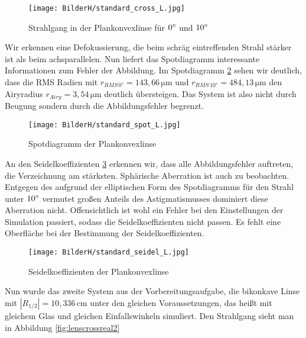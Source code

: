 \documentclass[twoside,colorback,accentcolor=tud4c,11pt]{tudreport}
\begin{document}
		
		\begin{figure}[H]
\centering
   	\begin{minipage}[b]{\textwidth}
\centering  
 	\texttt{[image: BilderH/standard\_cross\_L.jpg]}
   	\caption{Strahlgang in der Plankonvexlinse für $0\degree$ und $10\degree$}\label{fig:lenscrossreal1}
  	\end{minipage}
\end{figure}
				
		
		Wir erkennen eine Defokussierung, die beim schräg eintreffenden Strahl stärker ist als beim achsparallelen.
	Nun liefert das Spotdiagramm interessante Informationen zum Fehler der Abbildung. Im Spotdiagramm \ref{fig:lensspotreal1} sehen wir deutlich, dass die RMS Radien mit $r_{RMS \, 0°} = 143,66 \mathrm{\,\mu m} $ und $r_{RMS \, 10°} = 484,13\mathrm{\,\mu m} $ den Airyradius $r_{Airy} = 3,54 \mathrm{\,\mu m}$ deutlich übersteigen. Das System ist also nicht durch Beugung sondern durch die Abbildungsfehler begrenzt.
	
		\begin{figure}[H]
\centering
   	\begin{minipage}[b]{\textwidth}
\centering   	
\texttt{[image: BilderH/standard\_spot\_L.jpg]}
   	\caption{Spotdiagramm der Plankonvexlinse}\label{fig:lensspotreal1}
  	\end{minipage}
\end{figure}
		
	An den Seidelkoeffizienten \ref{fig:lensseidelreal1} erkennen wir, dass alle Abbildungsfehler auftreten, die Verzeichnung am stärksten. Sphärische Aberration ist auch zu beobachten. Entgegen des aufgrund der elliptischen Form des Spotdiagramms für den Strahl unter $10\degree$ vermutet großen Anteils des Astigmatismusses dominiert diese Aberration nicht. Offensichtlich ist wohl ein Fehler bei den Einstellungen der Simulation passiert, sodass die Seidelkoeffizienten nicht passen. Es fehlt eine Oberfläche bei der Bestimmung der Seidelkoeffizienten.
	
\begin{figure}[H]
\centering
   	\begin{minipage}[b]{\textwidth}
\centering   	
\texttt{[image: BilderH/standard\_seidel\_L.jpg]}
   	\caption{Seidelkoeffizienten der Plankonvexlinse}\label{fig:lensseidelreal1}
  	\end{minipage}
\end{figure}
	
	Nun wurde das zweite System aus der Vorbereitungsaufgabe, die bikonkave Linse mit $|R_{1/2}| = 10,336\mathrm{\,cm}$ unter den gleichen Voraussetzungen, das heißt mit gleichem Glas und gleichen Einfallswinkeln simuliert. Den Strahlgang sieht man in Abbildung \ref{fig:lenscrossreal2}
	
\end{document}
